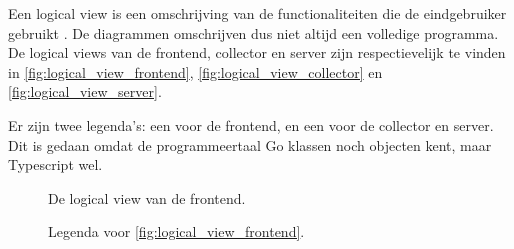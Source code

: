 \documentclass[../views.tex]{subfiles}
\begin{document}
Een logical view is een omschrijving van de functionaliteiten die de eindgebruiker gebruikt \parencite{architectural_blueprints}. De diagrammen omschrijven dus niet altijd een volledige programma. De logical views van de frontend, collector en server zijn respectievelijk te vinden in \autoref{fig:logical_view_frontend}, \autoref{fig:logical_view_collector} en \autoref{fig:logical_view_server}.

Er zijn twee legenda's: een voor de frontend, en een voor de collector en server. Dit is gedaan omdat de programmeertaal Go klassen noch objecten kent, maar Typescript wel.

\begin{figure}[ht]
  \centering
  \caption{De logical view van de frontend.}
  \label{fig:logical_view_frontend}
\end{figure}

\begin{figure}[ht]
  \centering
  \caption{Legenda voor \autoref{fig:logical_view_frontend}.}
\end{figure}
\end{document}
